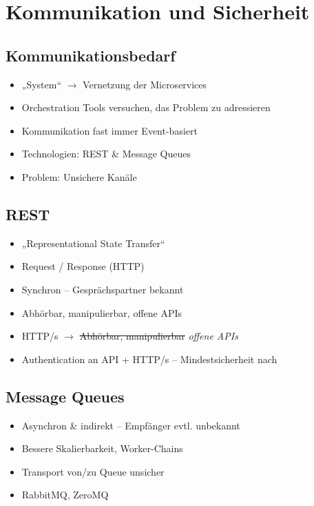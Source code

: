 \documentclass{beamer}
\begin{document}
\section{Kommunikation und Sicherheit}

\subsection{Kommunikationsbedarf}
\begin{frame}{\insertsubsection}
	\begin{itemize}
		\setlength\itemsep{1em}
		\item „System“ $\rightarrow$ Vernetzung der Microservices
		\item Orchestration Tools versuchen, das Problem zu adressieren
		\item Kommunikation fast immer Event-basiert
		\item Technologien: REST \& Message Queues
		\item Problem: Unsichere Kanäle
	\end{itemize}
\end{frame}

\subsection{REST}
\begin{frame}{\insertsubsection}
	\begin{itemize}
		\setlength\itemsep{1em}
		\item „Representational State Transfer“
		\item Request / Response (HTTP)
		\item Synchron -- Gesprächspartner bekannt
		\item Abhörbar, manipulierbar, offene APIs
		\item HTTP/s $\rightarrow$ \sout{Abhörbar, manipulierbar} \emph{offene APIs}
		\item Authentication an API + HTTP/s -- Mindestsicherheit nach \cite{newman2015}
	\end{itemize}
\end{frame}

\subsection{Message Queues}
\begin{frame}{\insertsubsection}
	\begin{itemize}
		\setlength\itemsep{2em}
		\item Asynchron \& indirekt -- Empfänger evtl. unbekannt
		\item Bessere Skalierbarkeit, Worker-Chains
		\item Transport von/zu Queue unsicher
		\item RabbitMQ, ZeroMQ
	\end{itemize}
\end{frame}
\end{document}
